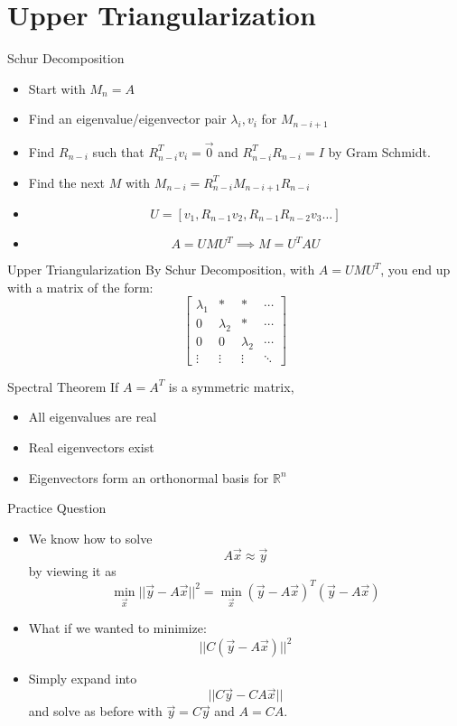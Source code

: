 \documentclass{beamer}
\begin{document}
\section[Triangularization]{Upper Triangularization}

\begin{frame}{Schur Decomposition}
\begin{itemize}[<+->]
\item Start with $M_n = A$
\item Find an eigenvalue/eigenvector pair $\lambda_i, v_i$ for $M_{n-i+1}$
\item Find $R_{n-i}$ such that $R_{n-i}^T v_{i} = \Vec{0}$ and $R_{n-i}^T R_{n-i} = I$ by Gram Schmidt. 
\item Find the next $M$ with $M_{n-i} = R_{n-i}^T M_{n-i+1} R_{n-i}$
\item \[U = [v_1, R_{n-1} v_2, R_{n-1} R_{n-2} v_3 \ldots ] \]
\item \[A = UMU^T \implies M = U^T A U \]
\end{itemize}
\end{frame}

\begin{frame}{Upper Triangularization}
By Schur Decomposition, with $A = UMU^T$, you end up with a matrix of the form:
\[
\begin{bmatrix}
\lambda_1 & * & * & \cdots \\
0 & \lambda_2 & * & \cdots \\
0 & 0 & \lambda_2 & \cdots \\
\vdots & \vdots & \vdots & \ddots
\end{bmatrix}
\]
\end{frame}

\begin{frame}{Spectral Theorem}
If $A = A^T$ is a symmetric matrix,
\begin{itemize} [<+->]
\item All eigenvalues are real
\item Real eigenvectors exist
\item Eigenvectors form an orthonormal basis for $\mathbb{R}^n$
\end{itemize}
\end{frame}

\begin{frame}{Practice Question}
\begin{itemize} [<+->]
\item We know how to solve
\[A \Vec{x} \approx \Vec{y} \]
by viewing it as 
\[\displaystyle \min \limits_{\Vec{x}} ||\Vec{y} - A\Vec{x}||^2 = \min \limits_{\Vec{x}} (\Vec{y} - A \Vec{x})^T (\Vec{y} - A \Vec{x}) \]
\item What if we wanted to minimize:
\[||C (\Vec{y} - A \Vec{x})||^2 \]
\item Simply expand into 
\[||C \Vec{y} - CA \vec{x}|| \]
and solve as before with $\Vec{y} = C \Vec{y}$ and $A = CA$. 
\end{itemize}
\end{frame}
\end{document}
